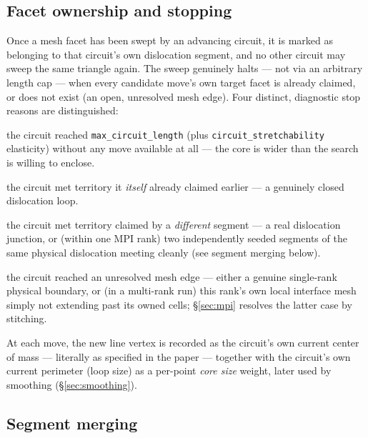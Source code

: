 \documentclass[11pt,a4paper]{article}
\newcommand{\code}[1]{\texttt{#1}}
\begin{document}
\subsection{Facet ownership and stopping}

Once a mesh facet has been swept by an advancing circuit, it is marked as belonging to that
circuit's own dislocation segment, and no other circuit may sweep the same triangle again. The
sweep genuinely halts — not via an arbitrary length cap — when every candidate move's own target
facet is already claimed, or does not exist (an open, unresolved mesh edge). Four distinct,
diagnostic stop reasons are distinguished:

\begin{description}[nosep]
  \item[\code{MaxLength}] the circuit reached \code{max\_circuit\_length} (plus
    \code{circuit\_stretchability} elasticity) without any move available at all — the core is
    wider than the search is willing to enclose.
  \item[\code{SelfClosure}] the circuit met territory it \emph{itself} already claimed earlier —
    a genuinely closed dislocation loop.
  \item[\code{Junction}] the circuit met territory claimed by a \emph{different} segment — a real
    dislocation junction, or (within one MPI rank) two independently seeded segments of the same
    physical dislocation meeting cleanly (see segment merging below).
  \item[\code{OpenEdge}] the circuit reached an unresolved mesh edge — either a genuine
    single-rank physical boundary, or (in a multi-rank run) this rank's own local interface mesh
    simply not extending past its owned cells; \S\ref{sec:mpi} resolves the latter case by
    stitching.
\end{description}

At each move, the new line vertex is recorded as the circuit's own current center of mass —
literally as specified in the paper — together with the circuit's own current perimeter (loop
size) as a per-point \emph{core size} weight, later used by smoothing (\S\ref{sec:smoothing}).

\subsection{Segment merging}
\end{document}
